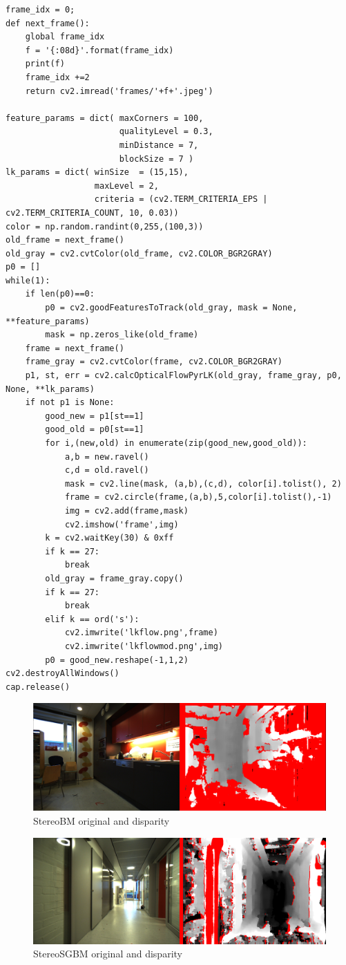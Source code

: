 \documentclass{article}
\begin{document}
\begin{verbatim}
frame_idx = 0;
def next_frame():
    global frame_idx
    f = '{:08d}'.format(frame_idx)
    print(f)
    frame_idx +=2
    return cv2.imread('frames/'+f+'.jpeg')

feature_params = dict( maxCorners = 100,
                       qualityLevel = 0.3,
                       minDistance = 7,
                       blockSize = 7 )
lk_params = dict( winSize  = (15,15),
                  maxLevel = 2,
                  criteria = (cv2.TERM_CRITERIA_EPS | cv2.TERM_CRITERIA_COUNT, 10, 0.03))
color = np.random.randint(0,255,(100,3))
old_frame = next_frame()
old_gray = cv2.cvtColor(old_frame, cv2.COLOR_BGR2GRAY)
p0 = []
while(1):
    if len(p0)==0:
        p0 = cv2.goodFeaturesToTrack(old_gray, mask = None, **feature_params)
        mask = np.zeros_like(old_frame)
    frame = next_frame()
    frame_gray = cv2.cvtColor(frame, cv2.COLOR_BGR2GRAY)
    p1, st, err = cv2.calcOpticalFlowPyrLK(old_gray, frame_gray, p0, None, **lk_params)
    if not p1 is None:
        good_new = p1[st==1]
        good_old = p0[st==1]
        for i,(new,old) in enumerate(zip(good_new,good_old)):
            a,b = new.ravel()
            c,d = old.ravel()
            mask = cv2.line(mask, (a,b),(c,d), color[i].tolist(), 2)
            frame = cv2.circle(frame,(a,b),5,color[i].tolist(),-1)
            img = cv2.add(frame,mask)
            cv2.imshow('frame',img)
        k = cv2.waitKey(30) & 0xff
        if k == 27:
            break
        old_gray = frame_gray.copy()
        if k == 27:
            break
        elif k == ord('s'):
            cv2.imwrite('lkflow.png',frame)
            cv2.imwrite('lkflowmod.png',img)
        p0 = good_new.reshape(-1,1,2)
cv2.destroyAllWindows()
cap.release()
\end{verbatim}
\newpage
\begin{figure}
\center
            \includegraphics[width=1\textwidth]{stereo}
\caption{StereoBM original and disparity}
\end{figure}       
\begin{figure}
\center
            \includegraphics[width=1\textwidth]{stereosgbm}
\caption{StereoSGBM original and disparity}
\end{figure}       
\end{document}
